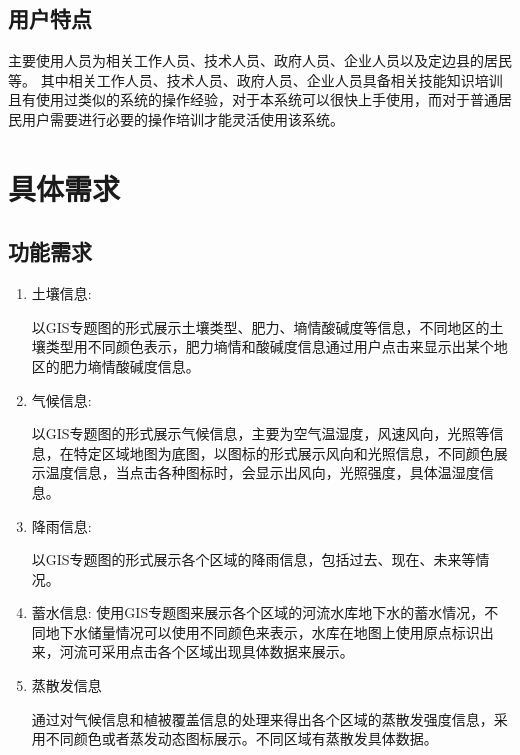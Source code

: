 \subsection{用户特点}

主要使用人员为相关工作人员、技术人员、政府人员、企业人员以及定边县的居民等。
其中相关工作人员、技术人员、政府人员、企业人员具备相关技能知识培训且有使用过类似的系统的操作经验，对于本系统可以很快上手使用，而对于普通居民用户需要进行必要的操作培训才能灵活使用该系统。


%
%

\section{具体需求}

\subsection{功能需求}

\begin{enumerate}
	\item 土壤信息:
	
	以GIS专题图的形式展示土壤类型、肥力、墒情酸碱度等信息，不同地区的土壤类型用不同颜色表示，肥力墒情和酸碱度信息通过用户点击来显示出某个地区的肥力墒情酸碱度信息。
    \item 气候信息:
 
    以GIS专题图的形式展示气候信息，主要为空气温湿度，风速风向，光照等信息，在特定区域地图为底图，以图标的形式展示风向和光照信息，不同颜色展示温度信息，当点击各种图标时，会显示出风向，光照强度，具体温湿度信息。
    \item 降雨信息:
    
    以GIS专题图的形式展示各个区域的降雨信息，包括过去、现在、未来等情况。
    \item 蓄水信息:
    使用GIS专题图来展示各个区域的河流水库地下水的蓄水情况，不同地下水储量情况可以使用不同颜色来表示，水库在地图上使用原点标识出来，河流可采用点击各个区域出现具体数据来展示。
    \item{蒸散发信息}
    
    通过对气候信息和植被覆盖信息的处理来得出各个区域的蒸散发强度信息，采用不同颜色或者蒸发动态图标展示。不同区域有蒸散发具体数据。
    
\end{enumerate}

